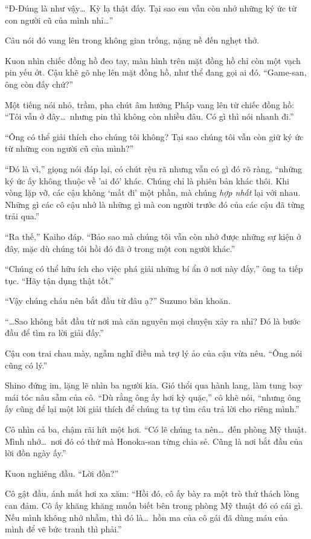 \documentclass[../main.tex]{subfiles}
\begin{document}
``Đ-Đúng là như vậy\dots\ Kỳ lạ thật đấy. Tại sao em vẫn còn nhớ những ký ức từ con người cũ của mình nhỉ\dots''

Câu nói đó vang lên trong không gian trống, nặng nề đến nghẹt thở.

Kuon nhìn chiếc đồng hồ đeo tay, màn hình trên mặt đồng hồ chỉ còn một vạch pin yếu ớt. Cậu khẽ gõ nhẹ lên mặt đồng hồ, như thể đang gọi ai đó. ``Game-san, ông còn đấy chứ?''

Một tiếng nói nhỏ, trầm, pha chút âm hưởng Pháp vang lên từ chiếc đồng hồ: ``Tôi vẫn ở đây\dots\ nhưng pin thì không còn nhiều đâu. Có gì thì nói nhanh đi.''

``Ông có thể giải thích cho chúng tôi không? Tại sao chúng tôi vẫn còn giữ ký ức từ những con người cũ của mình?''

``Đó là vì,'' giọng nói đáp lại, có chút rệu rã nhưng vẫn có gì đó rõ ràng, ``những ký ức ấy không thuộc về 'ai đó' khác. Chúng chỉ là phiên bản khác thôi. Khi vòng lặp vỡ, các cậu không `mất đi' một phần, mà chúng \emph{hợp nhất} lại với nhau. Những gì các cô cậu nhớ là những gì mà con người trước đó của các cậu đã từng trải qua.''

``Ra thế,'' Kaiho đáp. ``Bảo sao mà chúng tôi vẫn còn nhớ được những sự kiện ở đây, mặc dù chúng tôi hồi đó đã ở trong một con người khác.''

``Chúng có thể hữu ích cho việc phá giải những bí ẩn ở nơi này đấy,'' ông ta tiếp tục. ``Hãy tận dụng thật tốt.''

``Vậy chúng cháu nên bắt đầu từ đâu ạ?'' Suzuno băn khoăn.

``\dots Sao không bắt đầu từ nơi mà căn nguyên mọi chuyện xảy ra nhỉ? Đó là bước đầu để tìm ra lời giải đấy.''

Cậu con trai chau mày, ngẫm nghĩ điều mà trợ lý ảo của cậu vừa nêu.  ``Ông nói cũng có lý.''

Shino đứng im, lặng lẽ nhìn ba người kia. Gió thổi qua hành lang, làm tung bay mái tóc nâu sẫm của cô. ``Dù rằng ông ấy hơi kỳ quặc,'' cô khẽ nói, ``nhưng ông ấy cũng để lại một lời giải thích để chúng ta tự tìm câu trả lời cho riêng mình.''

Cô nhìn cả ba, chậm rãi hít một hơi.  ``Có lẽ chúng ta nên\dots\ đến phòng Mỹ thuật. Mình nhớ\dots\ nơi đó có thứ mà Honoka-san từng chia sẻ. Cũng là nơi bắt đầu của lời đồn ngày ấy.''

Kuon nghiêng đầu. ``Lời đồn?''

Cô gật đầu, ánh mắt hơi xa xăm: ``Hồi đó, cô ấy bày ra một trò thử thách lòng can đảm. Cô ấy khăng khăng muốn biết bên trong phòng Mỹ thuật đó có cái gì. Nếu mình không nhớ nhầm, thì đó là\dots\ hồn ma của cô gái đã dùng máu của mình để vẽ bức tranh thì phải.''
\end{document}
